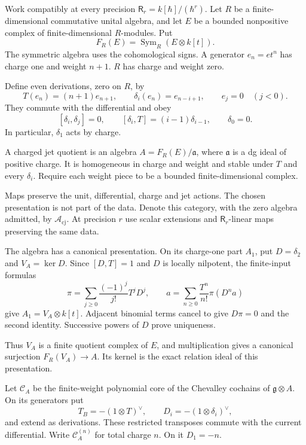 Work compatibly at every precision
$\mathsf R_r=k[\hbar]/(\hbar^r)$. Let $R$ be a finite-dimensional
commutative unital algebra, and let $E$ be a bounded nonpositive
complex of finite-dimensional $R$-modules. Put
\[
 F_R(E)=\operatorname{Sym}_R(E\otimes k[t]).
\]
The symmetric algebra uses the cohomological signs. A generator
$e_n=et^n$ has charge one and weight $n+1$. $R$ has charge and
weight zero.

Define even derivations, zero on $R$, by
\begin{equation}\label{cycmp:eq:jet-actions}
 T(e_n)=(n+1)e_{n+1},\qquad
 \delta_i(e_n)=e_{n-i+1},\qquad e_j=0\quad(j<0).
\end{equation}
They commute with the differential and obey
\[
 [\delta_i,\delta_j]=0,\qquad
 [\delta_i,T]=(i-1)\delta_{i-1},\qquad \delta_0=0.
\]
In particular, $\delta_1$ acts by charge.

\begin{definition}\label{cycmp:def:charged-quotient}
A charged jet quotient is an algebra $A=F_R(E)/\mathfrak a$, where
$\mathfrak a$ is a dg ideal of positive charge.
It is homogeneous in charge and weight and stable under $T$ and
every $\delta_i$.
Require each weight piece to be a bounded finite-dimensional complex.

Maps preserve the unit, differential, charge and jet actions.
The chosen presentation is not part of the data. Denote this category,
with the zero algebra admitted, by $\mathcal A_{\mathrm{cj}}$.
At precision $r$ use scalar extensions and $\mathsf R_r$-linear maps
preserving the same data.
\end{definition}

The algebra has a canonical presentation. On its charge-one part
$A_1$, put $D=\delta_2$ and $V_A=\ker D$. Since $[D,T]=1$ and
$D$ is locally nilpotent, the finite-input formulas
\begin{equation}\label{cycmp:eq:weyl-projector}
 \pi=\sum_{j\ge0}\frac{(-1)^j}{j!}T^jD^j,
 \qquad a=\sum_{n\ge0}\frac{T^n}{n!}\pi(D^na)
\end{equation}
give $A_1=V_A\otimes k[t]$. Adjacent binomial terms cancel to give
$D\pi=0$ and the second identity. Successive powers of $D$ prove
uniqueness.

Thus $V_A$ is a finite quotient complex of $E$, and
multiplication gives a canonical surjection $F_R(V_A)\to A$.
Its kernel is the exact relation ideal of this presentation.

Let $\mathcal C_A$ be the finite-weight polynomial core of the
Chevalley cochains of $\mathfrak g\otimes A$. On its generators put
\[
 T_B=-(1\otimes T)^\vee,\qquad
 D_i=-(1\otimes\delta_i)^\vee,
\]
and extend as derivations. These restricted transposes commute with
the current differential. Write $\mathcal C_A^{(n)}$ for total
charge $n$. On it $D_1=-n$.

